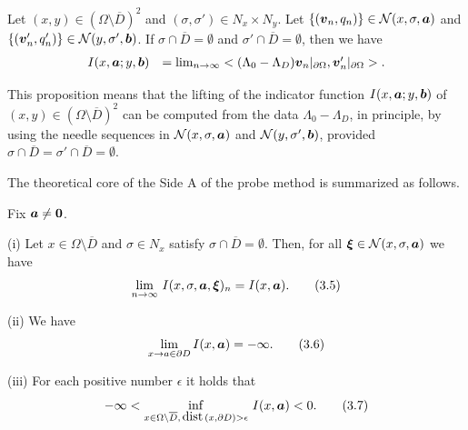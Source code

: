Let $(x,y)\in(\Omega\setminus\overline{D})^2$ and $(\sigma,\sigma')\in N_x\times N_y$.
Let $\{(\mbox{\boldmath $v$}_n, q_n)\}\in {\cal N}(x,\sigma,\mbox{\boldmath $a$})$
and $\{(\mbox{\boldmath $v$}_n', q_n')\}\in{\cal N}(y,\sigma',\mbox{\boldmath $b$})$.
If $\sigma\cap\overline{D}=\emptyset$ and $\sigma'\cap\overline{D}=\emptyset$, then we have
$$\begin{array}{ll}
\displaystyle
I(x,\mbox{\boldmath $a$};y,\mbox{\boldmath $b$})
&
=
\lim_{n\rightarrow\infty}<(\Lambda_0-\Lambda_D)\mbox{\boldmath $v$}_n\vert_{\partial\Omega},\mbox{\boldmath $v$}_n'\vert_{\partial\Omega}>.
\end{array}
$$

\endproclaim


\noindent
This proposition means that the lifting of the indicator 
function $I(x,\mbox{\boldmath $a$};y,\mbox{\boldmath $b$})$ 
of $(x,y)\in (\Omega\setminus\overline{D})^2$ can be computed from
the data $\Lambda_0-\Lambda_D$, in principle, by using the needle sequences in
${\cal N}(x,\sigma,\mbox{\boldmath $a$})$ and $ {\cal N}(y,\sigma',\mbox{\boldmath $b$})$,
provided $\sigma\cap\overline{D}=\sigma'\cap\overline{D}=\emptyset$.




 
 
 
 
 
 
 
 
 
 
 
 
 
 
 
 
 
 
The theoretical core of the Side A of the probe method is summarized as follows.

  Fix $\mbox{\boldmath $a$}\not=\mbox{\boldmath $0$}$.

\noindent
(i)  Let $x\in\Omega\setminus\overline{D}$ and $\sigma\in N_x$ satisfy $\sigma\cap\overline{D}=\emptyset$.
Then, for all $\mbox{\boldmath $\xi$}\in {\cal N}(x,\sigma,\mbox{\boldmath $a$})$ we have
$$\displaystyle
\lim_{n\rightarrow\infty}\,I(x,\sigma, \mbox{\boldmath $a$},\mbox{\boldmath $\xi$})_n=
I(x,\mbox{\boldmath $a$}).
\tag {3.5}
$$

\noindent
(ii) We have
$$\displaystyle
\lim_{x\rightarrow a\in\partial D}I(x,\mbox{\boldmath $a$})=-\infty.
\tag {3.6}
$$


\noindent
(iii)  For each positive number $\epsilon$ it holds that
$$\displaystyle
-\infty<\inf_{x\in\Omega\setminus\overline{D},\,\text{dist}\,(x,\partial D)>\epsilon}\,I(x,\mbox{\boldmath $a$})<0.
\tag {3.7}
$$






